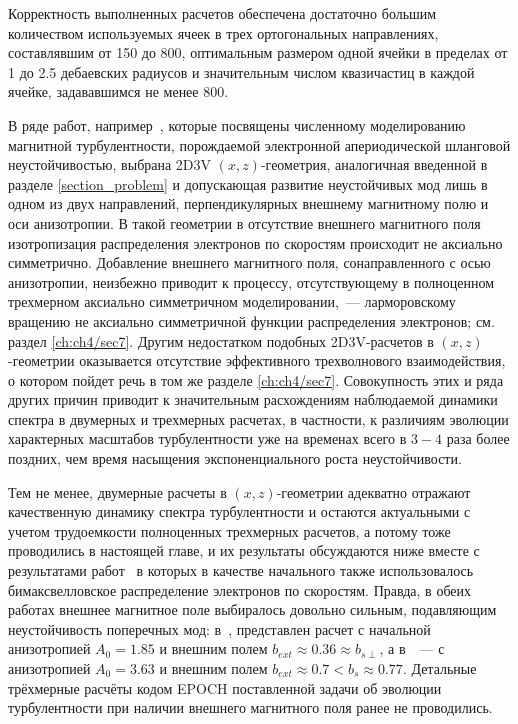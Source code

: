 Корректность выполненных расчетов обеспечена достаточно большим количеством используемых ячеек в трех ортогональных направлениях, составлявшим от 150 до 800, оптимальным размером одной ячейки в пределах от 1 до 2.5 дебаевских радиусов и значительным числом квазичастиц в каждой ячейке, задававшимся не менее 800.

В ряде работ, например~\cite{Camporeale2008,Hellinger2014,Lazar2023,Lopez2020}, которые посвящены численному моделированию магнитной турбулентности, порождаемой электронной апериодической шланговой неустойчивостью, выбрана 2D3V $(x,z)$-геометрия, аналогичная введенной в разделе \ref{section_problem} и допускающая развитие неустойчивых мод лишь в одном из двух направлений, перпендикулярных внешнему магнитному полю и оси анизотропии. В такой геометрии в отсутствие внешнего магнитного поля изотропизация распределения электронов по скоростям происходит не аксиально симметрично. Добавление внешнего магнитного поля, сонаправленного с осью анизотропии, неизбежно приводит к процессу, отсутствующему в полноценном трехмерном аксиально симметричном моделировании,~--- ларморовскому вращению не аксиально симметричной функции распределения электронов; см. раздел \ref{ch:ch4/sec7}. Другим недостатком подобных 2D3V-расчетов в $(x,z)$-геометрии оказывается отсутствие эффективного трехволнового взаимодействия, о котором пойдет речь в том же разделе \ref{ch:ch4/sec7}. Совокупность этих и ряда других причин приводит к значительным расхождениям наблюдаемой динамики спектра в двумерных и трехмерных расчетах, в частности, к различиям эволюции характерных масштабов турбулентности уже на временах всего в $3-4$ раза более поздних, чем время насыщения экспоненциального роста неустойчивости.

Тем не менее, двумерные расчеты в $(x,z)$-геометрии адекватно отражают качественную динамику спектра турбулентности и остаются актуальными с учетом трудоемкости полноценных трехмерных расчетов, а потому тоже проводились в настоящей главе, и их результаты обсуждаются ниже вместе с результатами работ~\cite{Camporeale2008,Hellinger2014} в которых в качестве начального также использовалось бимаксвелловское распределение электронов по скоростям. Правда, в обеих работах внешнее магнитное поле выбиралось довольно сильным, подавляющим неустойчивость поперечных мод: в~\cite{Camporeale2008}, представлен расчет с начальной анизотропией $A_0=1.85$ и внешним полем $b_{ext}\approx0.36\approx b_{s\perp}$, а в~\cite{Camporeale2008}~--- с анизотропией $A_0=3.63$ и внешним полем $b_{ext}\approx0.7 < b_{s}\approx0.77$. Детальные трёхмерные расчёты кодом EPOCH поставленной задачи об эволюции турбулентности при наличии внешнего магнитного поля ранее не проводились.


